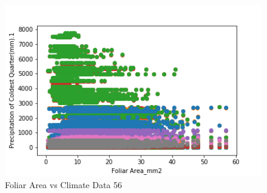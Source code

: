 \documentclass[letterpaper]{article}
\begin{document}
\begin{figure}[h]
\caption{Foliar Area vs Climate Data 56\label{fig:Foliar_Area_vs_56}}
\centering
\includegraphics[width=0.7\paperwidth]{Foliar_Area_vs_56}
\end{figure}
\end{document}
